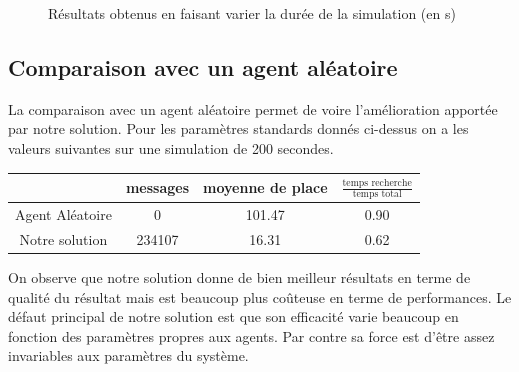 \begin{figure}
\begin{center}
  \end{center}

  \caption{Résultats obtenus en faisant varier la durée de la simulation (en s)}
  \label{timesim:all}
\end{figure}

\subsection{Comparaison avec un agent aléatoire}

La comparaison avec un agent aléatoire permet de voire l'amélioration apportée par notre solution.
Pour les paramètres standards donnés ci-dessus on a les valeurs suivantes sur une simulation de 200 secondes.

\begin{center}
  \begin{tabular}{c|c|c|c}
    & messages      & moyenne de place & $\frac{\mbox{temps recherche}}{\mbox{temps total}}$\\
    \hline
    Agent Aléatoire & 0        & 101.47                            & 0.90\\
    \hline
    Notre solution  & 234107   & 16.31                             & 0.62\\
  \end{tabular}
\end{center}

On observe que notre solution donne de bien meilleur résultats en terme de qualité du résultat mais est beaucoup plus coûteuse en terme de performances. Le défaut principal de notre solution est que son efficacité varie beaucoup en fonction des paramètres propres aux agents. Par contre sa force est d'être assez invariables aux paramètres du système.

